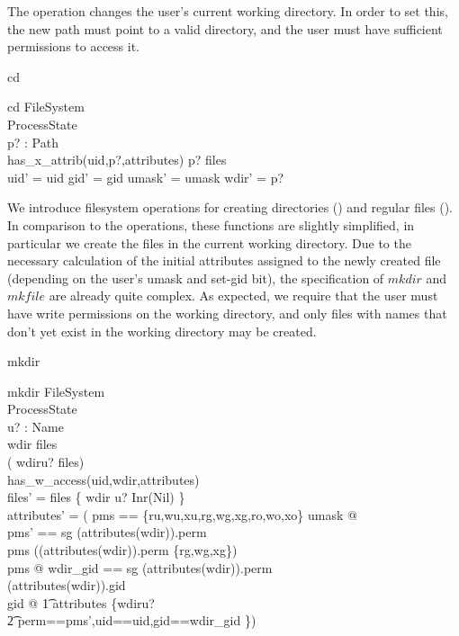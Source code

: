 The operation  changes the user's current working 
directory.  In order to set this, the new path must point to a valid directory, 
and the user must have sufficient permissions to access
it.
\enlargethispage{3.5\baselineskip}
\begin{doc}{cd}
  \begin{schema}{cd}
    \Xi FileSystem \\
    \Delta ProcessState \\
    p? : Path \\
    \where
    has\_x\_attrib(uid,p?,attributes) \land p? \isdirin files \\ 
    uid' = uid \land gid' = gid \land umask' = umask \land wdir' = p? \\
  \end{schema}
\end{doc}
We introduce filesystem operations for creating directories
() and regular files (). In comparison to the
\susv{} operations, these functions are slightly simplified, in particular we
create the files in the current working directory.  Due to the necessary
calculation of the initial attributes assigned to the newly created file
(depending on the user's umask and set-gid bit), the specification of $mkdir$
and $mkfile$ are already quite complex.  As expected, we require that the user
must have write permissions on the working directory, and only files with names
that don't yet exist in the working directory may be created.  
\enlargethispage{3.5\baselineskip}
\begin{doc}{mkdir}
  \begin{schema}{mkdir}
    \Delta FileSystem \\
    \Xi ProcessState \\
    u? : Name \\
    \where
    wdir \isdirin files \\
    \lnot ( wdir\cat\langle u? \rangle \isdirin files) \\
    has\_w\_access(uid,wdir,attributes) \\
    
    files' = files \cup \{ wdir \cat \langle u? \rangle \mapsto Inr(Nil) \} \\

    attributes' = ( \< \LET pms  == \{ru,wu,xu,rg,wg,xg,ro,wo,xo\} \setminus
    umask @ \\ 
    \LET pms' == \< \IF sg \in (attributes(wdir)).perm   \\
    \THEN pms \cup ((attributes(wdir)).perm \cap \{rg,wg,xg\}) \\
    \ELSE pms @ \>
    \LET wdir\_gid == \< \IF sg \in (attributes(wdir)).perm\\
    \THEN (attributes(wdir)).gid\\
    \ELSE gid @ \> 
    \t1 attributes \oplus \{wdir\cat\langle u?\rangle\mapsto \\
    \t2 \lblot perm==pms',uid==uid,gid==wdir\_gid \rblot \})\>
  \end{schema}
\end{doc}
